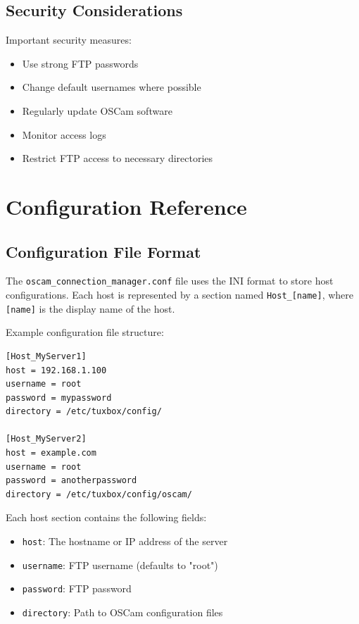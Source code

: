 \documentclass[a4paper,11pt]{report}
\begin{document}
\section{Security Considerations}
\begin{warningbox}
Important security measures:
\begin{itemize}
    \item Use strong FTP passwords
    \item Change default usernames where possible
    \item Regularly update OSCam software
    \item Monitor access logs
    \item Restrict FTP access to necessary directories
\end{itemize}
\end{warningbox}

\appendix
\chapter{Configuration Reference}

\section{Configuration File Format}
The \texttt{oscam\_connection\_manager.conf} file uses the INI format to store host configurations. Each host is represented by a section named \texttt{Host\_[name]}, where \texttt{[name]} is the display name of the host.

\begin{procedurebox}
Example configuration file structure:
\begin{verbatim}
[Host_MyServer1]
host = 192.168.1.100
username = root
password = mypassword
directory = /etc/tuxbox/config/

[Host_MyServer2]
host = example.com
username = root
password = anotherpassword
directory = /etc/tuxbox/config/oscam/
\end{verbatim}

Each host section contains the following fields:
\begin{itemize}
    \item \texttt{host}: The hostname or IP address of the server
    \item \texttt{username}: FTP username (defaults to "root")
    \item \texttt{password}: FTP password
    \item \texttt{directory}: Path to OSCam configuration files
\end{itemize}
\end{procedurebox}
\end{document}
